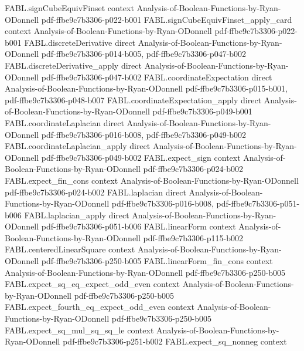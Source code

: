 \begin{theorem}
\proofstep
  {FABL.signCubeEquivFinset}
  {context}
  {Analysis-of-Boolean-Functions-by-Ryan-ODonnell}
  {pdf-ffbe9c7b3306-p022-b001}
\proofstep
  {FABL.signCubeEquivFinset_apply_card}
  {context}
  {Analysis-of-Boolean-Functions-by-Ryan-ODonnell}
  {pdf-ffbe9c7b3306-p022-b001}
\proofstep
  {FABL.discreteDerivative}
  {direct}
  {Analysis-of-Boolean-Functions-by-Ryan-ODonnell}
  {pdf-ffbe9c7b3306-p014-b005,
    pdf-ffbe9c7b3306-p047-b002}
\proofstep
  {FABL.discreteDerivative_apply}
  {direct}
  {Analysis-of-Boolean-Functions-by-Ryan-ODonnell}
  {pdf-ffbe9c7b3306-p047-b002}
\proofstep
  {FABL.coordinateExpectation}
  {direct}
  {Analysis-of-Boolean-Functions-by-Ryan-ODonnell}
  {pdf-ffbe9c7b3306-p015-b001,
    pdf-ffbe9c7b3306-p048-b007}
\proofstep
  {FABL.coordinateExpectation_apply}
  {direct}
  {Analysis-of-Boolean-Functions-by-Ryan-ODonnell}
  {pdf-ffbe9c7b3306-p049-b001}
\proofstep
  {FABL.coordinateLaplacian}
  {direct}
  {Analysis-of-Boolean-Functions-by-Ryan-ODonnell}
  {pdf-ffbe9c7b3306-p016-b008,
    pdf-ffbe9c7b3306-p049-b002}
\proofstep
  {FABL.coordinateLaplacian_apply}
  {direct}
  {Analysis-of-Boolean-Functions-by-Ryan-ODonnell}
  {pdf-ffbe9c7b3306-p049-b002}
\proofstep
  {FABL.expect_sign}
  {context}
  {Analysis-of-Boolean-Functions-by-Ryan-ODonnell}
  {pdf-ffbe9c7b3306-p024-b002}
\proofstep
  {FABL.expect_fin_cons}
  {context}
  {Analysis-of-Boolean-Functions-by-Ryan-ODonnell}
  {pdf-ffbe9c7b3306-p024-b002}
\proofstep
  {FABL.laplacian}
  {direct}
  {Analysis-of-Boolean-Functions-by-Ryan-ODonnell}
  {pdf-ffbe9c7b3306-p016-b008,
    pdf-ffbe9c7b3306-p051-b006}
\proofstep
  {FABL.laplacian_apply}
  {direct}
  {Analysis-of-Boolean-Functions-by-Ryan-ODonnell}
  {pdf-ffbe9c7b3306-p051-b006}
\proofstep
  {FABL.linearForm}
  {context}
  {Analysis-of-Boolean-Functions-by-Ryan-ODonnell}
  {pdf-ffbe9c7b3306-p115-b002}
\proofstep
  {FABL.centeredLinearSquare}
  {context}
  {Analysis-of-Boolean-Functions-by-Ryan-ODonnell}
  {pdf-ffbe9c7b3306-p250-b005}
\proofstep
  {FABL.linearForm_fin_cons}
  {context}
  {Analysis-of-Boolean-Functions-by-Ryan-ODonnell}
  {pdf-ffbe9c7b3306-p250-b005}
\proofstep
  {FABL.expect_sq_eq_expect_odd_even}
  {context}
  {Analysis-of-Boolean-Functions-by-Ryan-ODonnell}
  {pdf-ffbe9c7b3306-p250-b005}
\proofstep
  {FABL.expect_fourth_eq_expect_odd_even}
  {context}
  {Analysis-of-Boolean-Functions-by-Ryan-ODonnell}
  {pdf-ffbe9c7b3306-p250-b005}
\proofstep
  {FABL.expect_sq_mul_sq_sq_le}
  {context}
  {Analysis-of-Boolean-Functions-by-Ryan-ODonnell}
  {pdf-ffbe9c7b3306-p251-b002}
\proofstep
  {FABL.expect_sq_nonneg}
  {context}

\end{theorem}
